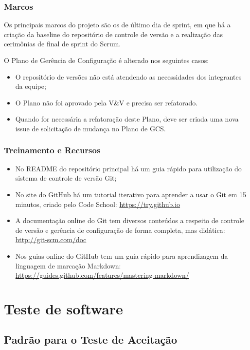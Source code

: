 \subsubsection{Marcos}

Os principais marcos do projeto são os de último dia de sprint, em que há a criação da baseline do repositório de controle de versão e a realização das cerimônias de final de sprint do Scrum. 

O Plano de Gerência de Configuração é alterado nos seguintes casos:

\begin{itemize}
\item O repositório de versões não está atendendo as necessidades dos integrantes da equipe;
\item O Plano não foi aprovado pela V\&V e precisa ser refatorado.
\item Quando for necessária a refatoração deste Plano, deve ser criada uma nova issue de solicitação de mudança no Plano de GCS.
\end{itemize}

\subsubsection{Treinamento e Recursos}

\begin{itemize}
\item No README do repositório principal há um guia rápido para utilização do sistema de controle de versão Git;
\item No site do GitHub há um tutorial iterativo para aprender a usar o Git em 15 minutos, criado pelo Code School: \url{https://try.github.io}
\item A documentação online do Git tem diversos conteúdos a respeito de controle de versão e gerência de configuração de forma completa, mas didática: \url{http://git-scm.com/doc}
\item Nos guias online do GitHub tem um guia rápido para aprendizagem da linguagem de marcação Markdown: \url{https://guides.github.com/features/mastering-markdown/}
\end{itemize}



\section{Teste de software}
\label{sec:teste}

\subsection{Padrão para o Teste de Aceitação}

